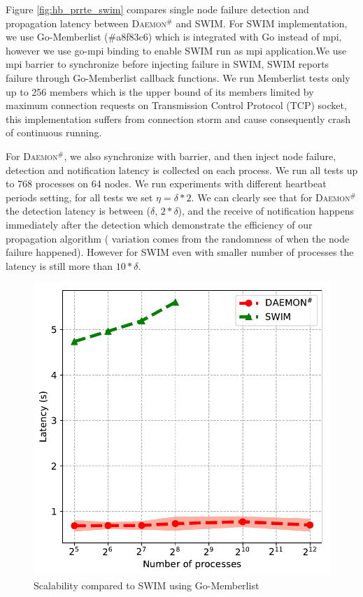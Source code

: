 \documentclass[sigconf]{acmart}
\newcommand{\ourwork}[0]{\textsc{Daemon}\ensuremath{^\#}\xspace}
\begin{document}
Figure \ref{fig:hb_prrte_swim} compares single node failure detection and propagation latency between \ourwork and SWIM. For SWIM implementation, we use Go-Memberlist (\#a8f83c6) which is integrated with Go instead of mpi, however we use go-mpi binding to enable SWIM run as mpi application.We use mpi barrier to synchronize before injecting failure in SWIM, SWIM reports failure through Go-Memberlist callback functions. We run Memberlist tests only up to 256 members which is the upper bound of its members limited by maximum connection requests on Transmission Control Protocol (TCP) socket, this implementation suffers from connection storm and cause consequently crash of continuous running. 

For \ourwork, we also synchronize with barrier, and then inject node failure, detection and notification latency is collected on each process. We run all tests up to 768 processes on 64 nodes. We run experiments with different heartbeat periods setting, for all tests we set $ \eta = \delta * 2 $. We can clearly see that for \ourwork the detection latency is between ($\delta$, $2*\delta$), and the receive of notification happens immediately after the detection which demonstrate the efficiency of our propagation algorithm ( variation comes from the randomness of when the node failure happened). However for SWIM even with smaller number of processes the latency is still more than $10*\delta$.

\begin{figure}[h]
  \centering
  \includegraphics[width=\linewidth]{Scale_prrte_swim.pdf}
  \caption{Scalability compared to SWIM using Go-Memberlist}
  \label{fig:scale_swim}
\end{figure}
\end{document}
